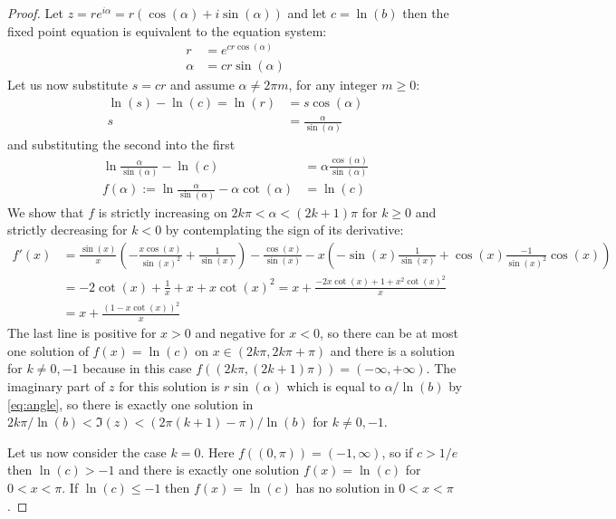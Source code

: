 \begin{proof}
  Let $z=re^{i\alpha}=r(\cos(\alpha)+i\sin(\alpha))$ and let
  $c=\ln(b)$ then the fixed point equation is equivalent to the
  equation system:
  \begin{align}
    r&=e^{cr\cos(\alpha)}\label{eq:radius}\\
    \alpha&=cr\sin(\alpha)\label{eq:angle}
  \end{align}
  Let us now substitute $s=cr$ and assume $\alpha\neq 2\pi m$,
  for any integer $m\ge 0$:
  \begin{align*}
    \ln(s)-\ln(c)=\ln(r) &= s\cos(\alpha)\\
    s&=\frac{\alpha}{\sin(\alpha)}
  \end{align*}
  and substituting the second into the first
  \begin{align*}
    \ln\frac{\alpha}{\sin(\alpha)}-\ln(c) &= \alpha
    \frac{\cos(\alpha)}{\sin(\alpha)}\\
    f(\alpha):=\ln\frac{\alpha}{\sin(\alpha)}-\alpha\cot(\alpha)&=\ln(c)
  \end{align*}
  We show that $f$ is strictly increasing on $2k\pi< \alpha <
  (2k+1)\pi$ for $k\ge 0$ and strictly decreasing for $k<0$ by
  contemplating the sign of its derivative:
  \begin{align*}
    f'(x) &= \frac{\sin(x)}{x}\left( -\frac{x \cos(x)}{\sin(x)^2}
      + \frac{1}{\sin(x)} \right) 
    -\frac{\cos(x)}{\sin(x)} - x\left(-\sin(x)\frac{1}{\sin(x)}
      +\cos(x)\frac{-1}{\sin(x)^2}\cos(x) \right)\\
    &= - 2\cot(x) +\frac{1}{x}+x + x\cot(x)^2 = 
     x+\frac{-2 x \cot(x) + 1 + x^2 \cot(x)^2}{x}\\
    &= x+\frac{(1- x \cot(x))^2 }{x}
  \end{align*}
  The last line is positive for $x>0$ and negative for $x<0$, so there
  can be at most one solution of $f(x)=\ln(c)$ on $x\in(2 k\pi, 2 k\pi + \pi)$
  and there is a solution for $k\neq 0,-1$ because in this case
  $f((2k\pi,(2k+1)\pi))=(-\infty,+\infty)$.
  The imaginary part of $z$ for this solution is $r \sin(\alpha)$
  which is equal to $\alpha/\ln(b)$ by \eqref{eq:angle}, so there is
  exactly one solution in $2k \pi/\ln(b) < \Im(z) < (2\pi(k+1)
  -\pi)/\ln(b)$ for $k\neq 0,-1$.

  Let us now consider the case $k=0$. Here $f((0,\pi))=(-1,\infty)$,
  so if $c>1/e$ then $\ln(c)>-1$ and there is exactly one solution
  $f(x)=\ln(c)$ for $0<x<\pi$. If $\ln(c)\le -1$ then $f(x)=\ln(c)$ has
  no solution in $0<x<\pi$.


\end{proof}
